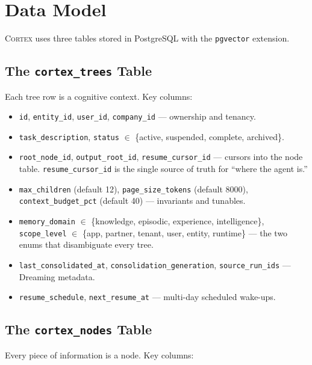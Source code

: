 \documentclass[11pt,a4paper]{article}
\theoremstyle{cortexprop}
\newcommand{\code}[1]{\texttt{#1}}
\begin{document}
\section{Data Model}
\label{sec:datamodel}

\textsc{Cortex} uses three tables stored in PostgreSQL with the
\code{pgvector} extension.

\subsection{The \code{cortex\_trees} Table}

Each tree row is a cognitive context. Key columns:

\begin{itemize}
  \item \code{id}, \code{entity\_id}, \code{user\_id}, \code{company\_id} ---
  ownership and tenancy.
  \item \code{task\_description}, \code{status} $\in$ \{active, suspended,
  complete, archived\}.
  \item \code{root\_node\_id}, \code{output\_root\_id},
  \code{resume\_cursor\_id} --- cursors into the node table.
  \code{resume\_cursor\_id} is the single source of truth for ``where the
  agent is.''
  \item \code{max\_children} (default 12), \code{page\_size\_tokens}
  (default 8000), \code{context\_budget\_pct} (default 40) --- invariants
  and tunables.
  \item \code{memory\_domain} $\in$ \{knowledge, episodic, experience,
  intelligence\}, \code{scope\_level} $\in$ \{app, partner, tenant, user,
  entity, runtime\} --- the two enums that disambiguate every tree.
  \item \code{last\_consolidated\_at}, \code{consolidation\_generation},
  \code{source\_run\_ids} --- Dreaming metadata.
  \item \code{resume\_schedule}, \code{next\_resume\_at} --- multi-day
  scheduled wake-ups.
\end{itemize}

\subsection{The \code{cortex\_nodes} Table}

Every piece of information is a node. Key columns:
\end{document}
